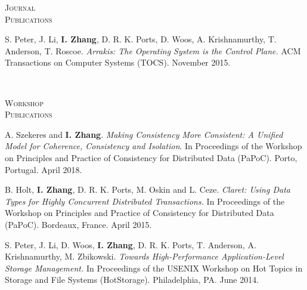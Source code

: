 \documentclass[10pt,minionpro]{report}
\newlength{\sectiongap}
\newlength{\sectioncolwidth}
\newlength{\colgap}
\newlength{\stuffwidth}
\newenvironment{rtable}{
  \begin{minipage}{\textwidth}
  }{
  \end{minipage}
}
\newenvironment{rsection}[1]{
  \begin{minipage}[t]{\sectioncolwidth}
    \textsc{#1}
  \end{minipage}
  \hspace{\colgap}
  \begin{minipage}[t]{\stuffwidth}
  }{
    \removelastskip
  \end{minipage}
  \\[\sectiongap]
}
\begin{document}
\begin{rtable}
\begin{rsection}{Journal\\Publications}
    S. Peter, J. Li, \textbf{I. Zhang}, D. R. K. Ports, D. Woos,
    A. Krishnamurthy, T. Anderson, T. Roscoe.  \textit{Arrakis: The
      Operating System is the Control Plane.}  ACM Transactions on
    Computer Systems (TOCS). November 2015.\\
  \end{rsection}


  
  \begin{rsection}{Workshop\\Publications}
    A. Szekeres and \textbf{I. Zhang}. \textit{Making Consistency More
      Consistent: A Unified Model for Coherence, Consistency and
      Isolation}. In Proceedings of the Workshop on Principles and
    Practice of Consistency for Distributed Data (PaPoC). Porto,
    Portugal. April 2018. \\\vspace{-0.5em}

    B. Holt, \textbf{I. Zhang}, D. R. K. Ports, M. Oskin and L. Ceze.
    \textit{Claret: Using Data Types for Highly Concurrent Distributed
      Transactions.} In Proceedings of the Workshop on Principles and
    Practice of Consistency for Distributed Data (PaPoC).  Bordeaux,
    France. April 2015.\\\vspace{-0.5em}

    S. Peter, J. Li, D. Woos, \textbf{I. Zhang}, D. R. K. Ports,
    T. Anderson, A. Krishnamurthy, M. Zbikowski. \textit{Towards
      High-Performance Application-Level Storage Management.} In
    Proceedings of the USENIX Workshop on Hot Topics in Storage and
    File Systems (HotStorage). Philadelphia, PA. June
    2014.
  \end{rsection}
\end{rtable}
\end{document}
